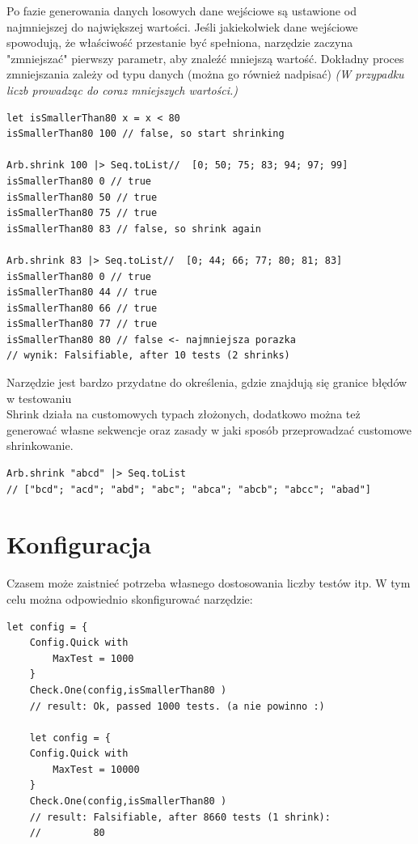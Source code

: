 Po fazie generowania danych losowych dane wejściowe są ustawione od najmniejszej do największej wartości. Jeśli jakiekolwiek dane wejściowe spowodują, że właściwość przestanie być spełniona, narzędzie zaczyna "zmniejszać" pierwszy parametr, aby znaleźć mniejszą wartość. Dokładny proces zmniejszania zależy od typu danych (można go również nadpisać) \textit{(W przypadku liczb prowadząc do coraz mniejszych wartości.)}

\lstset{language=FSharp, basicstyle=\scriptsize}
\begin{lstlisting}[frame=single,caption={Przykład shrinking na liczbach},label=kod:listingA]
let isSmallerThan80 x = x < 80
isSmallerThan80 100 // false, so start shrinking

Arb.shrink 100 |> Seq.toList//  [0; 50; 75; 83; 94; 97; 99]
isSmallerThan80 0 // true
isSmallerThan80 50 // true
isSmallerThan80 75 // true
isSmallerThan80 83 // false, so shrink again

Arb.shrink 83 |> Seq.toList//  [0; 44; 66; 77; 80; 81; 83]
isSmallerThan80 0 // true
isSmallerThan80 44 // true
isSmallerThan80 66 // true
isSmallerThan80 77 // true
isSmallerThan80 80 // false <- najmniejsza porazka
// wynik: Falsifiable, after 10 tests (2 shrinks)
\end{lstlisting}

Narzędzie jest bardzo przydatne do określenia, gdzie znajdują się granice błędów w testowaniu\\
Shrink działa na customowych typach złożonych, dodatkowo można też generować własne sekwencje oraz zasady w jaki sposób przeprowadzać customowe shrinkowanie. 

\lstset{language=FSharp, basicstyle=\scriptsize}
\begin{lstlisting}[frame=single,caption={Shrinkowanie ciągu znaków},label=kod:listingA]
Arb.shrink "abcd" |> Seq.toList
// ["bcd"; "acd"; "abd"; "abc"; "abca"; "abcb"; "abcc"; "abad"]
\end{lstlisting}

\section*{Konfiguracja}
Czasem może zaistnieć potrzeba własnego dostosowania liczby testów itp. W tym celu można odpowiednio skonfigurować narzędzie:
\lstset{language=FSharp, basicstyle=\scriptsize}
\begin{lstlisting}[frame=single,caption={Dostosowanie konfiguracji testów},label=kod:listingA]
let config = {
    Config.Quick with
        MaxTest = 1000
    }
    Check.One(config,isSmallerThan80 )
    // result: Ok, passed 1000 tests. (a nie powinno :)
    
    let config = {
    Config.Quick with
        MaxTest = 10000
    }
    Check.One(config,isSmallerThan80 )
    // result: Falsifiable, after 8660 tests (1 shrink):
    //         80
\end{lstlisting}

